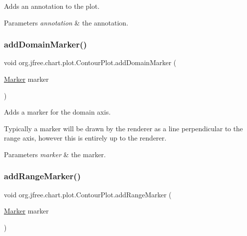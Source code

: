 Adds an annotation to the plot.


\begin{DoxyParams}{Parameters}
{\em annotation} & the annotation. \\
\hline
\end{DoxyParams}
\mbox{\label{classorg_1_1jfree_1_1chart_1_1plot_1_1_contour_plot_a2165f544a5254c42cf32f080aa3a1944}} 
\subsubsection{\texorpdfstring{add\+Domain\+Marker()}{addDomainMarker()}}
{\footnotesize\ttfamily void org.\+jfree.\+chart.\+plot.\+Contour\+Plot.\+add\+Domain\+Marker (\begin{DoxyParamCaption}\item[{\mbox{\hyperlink{classorg_1_1jfree_1_1chart_1_1plot_1_1_marker}{Marker}}}]{marker }\end{DoxyParamCaption})}

Adds a marker for the domain axis. 

Typically a marker will be drawn by the renderer as a line perpendicular to the range axis, however this is entirely up to the renderer.


\begin{DoxyParams}{Parameters}
{\em marker} & the marker. \\
\hline
\end{DoxyParams}
\mbox{\label{classorg_1_1jfree_1_1chart_1_1plot_1_1_contour_plot_a83b16f53a2cf8e10a6b97e12dce21e57}} 
\subsubsection{\texorpdfstring{add\+Range\+Marker()}{addRangeMarker()}}
{\footnotesize\ttfamily void org.\+jfree.\+chart.\+plot.\+Contour\+Plot.\+add\+Range\+Marker (\begin{DoxyParamCaption}\item[{\mbox{\hyperlink{classorg_1_1jfree_1_1chart_1_1plot_1_1_marker}{Marker}}}]{marker }\end{DoxyParamCaption})}

